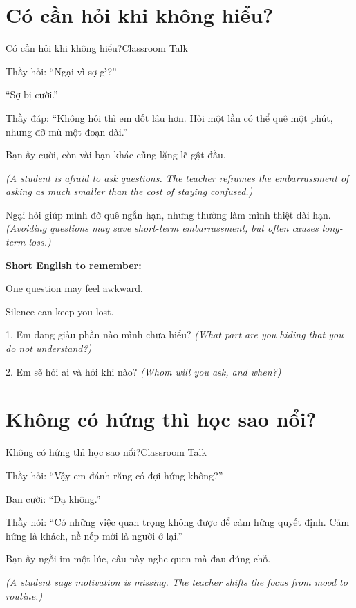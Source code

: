 \section{Có cần hỏi khi không hiểu?}
\begin{truyen}{Có cần hỏi khi không hiểu?}{Classroom Talk}

Thầy hỏi: ``Ngại vì sợ gì?''

``Sợ bị cười.''

Thầy đáp: ``Không hỏi thì em dốt lâu hơn. Hỏi một lần có thể quê một phút, nhưng đỡ mù một đoạn dài.''

Bạn ấy cười, còn vài bạn khác cũng lặng lẽ gật đầu.

\textit{(A student is afraid to ask questions. The teacher reframes the embarrassment of asking as much smaller than the cost of staying confused.)}
\end{truyen}

\begin{baihoc}
Ngại hỏi giúp mình đỡ quê ngắn hạn, nhưng thường làm mình thiệt dài hạn.
\textit{(Avoiding questions may save short-term embarrassment, but often causes long-term loss.)}
\end{baihoc}

\begin{ghinhoanh}
\textbf{Short English to remember:}

One question may feel awkward.

Silence can keep you lost.
\end{ghinhoanh}

\begin{tuhocnhanh}
1. Em đang giấu phần nào mình chưa hiểu? \textit{(What part are you hiding that you do not understand?)}

2. Em sẽ hỏi ai và hỏi khi nào? \textit{(Whom will you ask, and when?)}
\end{tuhocnhanh}
\ngancach

\section{Không có hứng thì học sao nổi?}
\begin{truyen}{Không có hứng thì học sao nổi?}{Classroom Talk}

Thầy hỏi: ``Vậy em đánh răng có đợi hứng không?''

Bạn cười: ``Dạ không.''

Thầy nói: ``Có những việc quan trọng không được để cảm hứng quyết định. Cảm hứng là khách, nề nếp mới là người ở lại.''

Bạn ấy ngồi im một lúc, câu này nghe quen mà đau đúng chỗ.

\textit{(A student says motivation is missing. The teacher shifts the focus from mood to routine.)}
\end{truyen}

